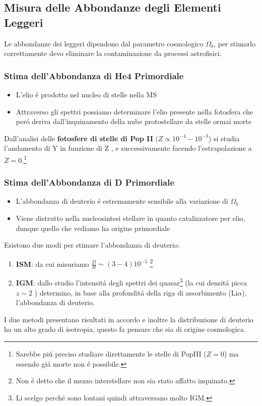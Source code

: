\documentclass[12pt, a4paper]{article}
\begin{document}
\subsection{Misura delle Abbondanze degli Elementi Leggeri}
Le abbondanze dei leggeri dipendono dal parametro cosmologico $\Omega_b$, per stimarlo correttamente devo eliminare la contaminazione da processi astrofisici.
\subsubsection{Stima dell'Abbondanza di He4 Primordiale}
\begin{itemize}
\item L'elio  \'{e} prodotto nel nucleo di stelle nella MS
\item Attraverso gli spettri possiamo determinare l'elio presente nella fotosfera che per\'{o} deriva dall'inquinamento della nube protostellare da stelle ormai morte
\end{itemize}

Dall'analisi delle \textbf{fotosfere di stelle di Pop II} ($Z\propto 10^{-4}-10^{-3}$) si studia l'andamento di Y in funzione di Z , e successivamente facendo l'estrapolazione a $Z=0$.\footnote{Sarebbe pi\'{u} preciso studiare direttamente le stelle di PopIII ($Z=0$) ma essendo gi\'{a} morte non \'{e} possibile.}
\subsubsection{Stima dell'Abbondanza di D Primordiale}
\begin{itemize}
\item L'abbondanza di deuterio \'{e} estremamente sensibile alla variazione di $\Omega_b$
\item Viene distrutto nella nucleosintesi stellare in quanto catalizzatore per elio, dunque quello che vediamo ha origine primordiale
\end{itemize}
Esistono due modi per stimare l'abbondanza di deuterio:
\begin{enumerate}
\item \textbf{ISM}: da cui misuriamo $\frac{D}{H}\sim (3-4)10^{-5}$ \footnote{Non \'{e} detto che il mezzo interstellare non sia stato affatto inquinato.}
\item \textbf{IGM}: dallo studio l'intensit\'{a} degli spettri dei quasar\footnote{Li scelgo perch\'{e} sono lontani quindi attraversano molto IGM.} (la cui densit\'{a} picca $z\sim 2$ ) determino,  in base alla profondit\'{a} della riga di assorbimento (Li$\alpha$), l'abbondanza di deuterio.
\end{enumerate}
I due metodi presentano risultati in accordo e inoltre la distribuzione di deuterio ha un alto grado di isotropia, questo fa pensare che sia di origine cosmologica.
\end{document}
